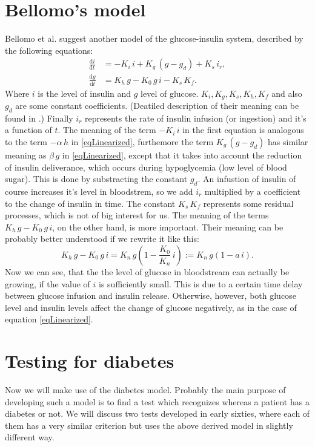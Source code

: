 \documentclass{article}
\providecommand{\m}[1]{\ensuremath{\mathrm{#1}}}
\begin{document}
\section{Bellomo's model}
Bellomo et al. \cite{bellomo} suggest another model of the glucose-insulin system, described by the following equations:
\begin{equation*}
\begin{aligned}
 \frac{\m{d}i}{\m{d}t} &= -K_i\,i + K_g\,(g - g_d) + K_s\,i_r, \\
 \frac{\m{d}g}{\m{d}t} &= K_h\,g - K_0\,g\,i - K_s\,K_f.
\end{aligned}
\end{equation*}
Where $i$ is the level of insulin and $g$ level of glucose.
$K_i, K_g, K_s, K_h, K_f$ and also $g_d$ are some constant coefficients.
(Deatiled description of their meaning can be found in \cite{bellomo}.)
Finally $i_r$ represents the rate of insulin infusion (or ingestion) and it's a function of $t$.
The meaning of the term $-K_i\,i$ in the first equation is analogous to the term $-\alpha\,h$ in \eqref{eqLinearized},
furthemore the term $K_g\,(g - g_d)$ has similar meaning as $\beta\,g$ in \eqref{eqLinearized},
except that it takes into account the reduction of insulin deliverance, which occurs during hypoglycemia 
(low level of blood sugar). This is done by substracting the constant $g_d$.
An infustion of insulin of course increases it's level in bloodstrem, so we add $i_r$ multiplied by a coefficient
to the change of insulin in time. The constant $K_s\,K_f$ represents some residual processes,
which is not of big interest for us. The meaning of the terms $K_h\,g - K_0\,g\,i$, on the other hand,
is more important. Their meaning can be probably better understood if we rewrite it like this:
\[ K_h\,g - K_0\,g\,i = K_n\,g(1 - \frac{K_0}{K_n}\,i) := K_n\,g(1 - a\,i). \]
Now we can see, that the the level of glucose in bloodstream can actually be growing, if
the value of $i$ is sufficiently small.
This is due to a certain time delay between glucose infusion and insulin release.
Otherwise, however, both glucose level and insulin levels affect the change of glucose negatively,
as in the case of equation \eqref{eqLinearized}.

\section{Testing for diabetes}
Now we will make use of the diabetes model. Probably the main purpose of developing such a model is to find a test which recognizes whereas a patient has a diabetes or not. We will discuss two tests developed in early sixties, where each of them has a very similar criterion but uses the above derived model in slightly different way.
\end{document}
